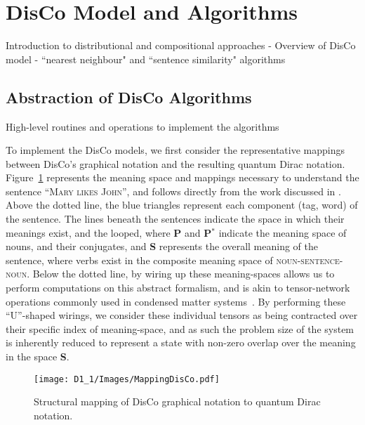 \section{DisCo Model and Algorithms}
\label{sec:disco_model_and_algorithms}
Introduction to distributional and compositional approaches - Overview of DisCo model - ``nearest neighbour" and ``sentence similarity" algorithms~\cite{DisCoWillBob}

\subsection{Abstraction of DisCo Algorithms}%
\label{sec:abstraction_of_disco_algorithms}
High-level routines and operations to implement the algorithms


To implement the DisCo models, we first consider the representative mappings between DisCo's graphical notation and the resulting quantum Dirac notation. Figure~\ref{fig:disco_dirac} represents the meaning space and mappings necessary to understand the sentence ``\textsc{Mary likes John}'', and follows directly from the work discussed in \cite{Coecke_Sadrzadeh_Clark_2010}. Above the dotted line, the blue triangles represent each component (tag, word) of the sentence. The lines beneath the sentences indicate the space in which their meanings exist, and the looped, where \textbf{P} and \textbf{P$^*$} indicate the meaning space of nouns, and their conjugates, and \textbf{S} represents the overall meaning of the sentence, where verbs exist in the composite meaning space of \textsc{noun-sentence-noun}. Below the dotted line, by wiring up these meaning-spaces allows us to perform computations on this abstract formalism, and is akin to tensor-network operations commonly used in condensed matter systems~\cite{ Coecke_Paquette_Pavlovic_2009,Biamonte_Clark_Jaksch_2011}. By performing these ``U''-shaped wirings, we consider these individual tensors as being contracted over their specific index of meaning-space, and as such the problem size of the system is inherently reduced to represent a state with non-zero overlap over the meaning in the space \textbf{S}.

\begin{figure}[H]
    \centering
    \texttt{[image: D1\_1/Images/MappingDisCo.pdf]}
    \caption{Structural mapping of DisCo graphical notation to quantum Dirac notation. }
    \label{fig:disco_dirac}
\end{figure}


